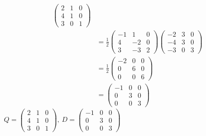 \documentclass[13pt]{article}
\begin{document}
\begin{enumerate}[label=(\alph*),leftmargin=*]
\begin{align*}
        \begin{pmatrix}
          2 & 1 & 0 \\
          4 & 1 & 0 \\
          3 & 0 & 1
        \end{pmatrix} \\
      &= \frac{1}{2}
        \begin{pmatrix}
          -1 & 1 & 0 \\
          4 & -2 & 0 \\
          3 & -3 & 2
        \end{pmatrix}
        \begin{pmatrix}
          -2 & 3 & 0 \\
          -4 & 3 & 0 \\
          -3 & 0 & 3
        \end{pmatrix} \\
      &= \frac{1}{2}
        \begin{pmatrix}
          -2 & 0 & 0 \\
          0 & 6 & 0 \\
          0 & 0 & 6
        \end{pmatrix} \\
      &=
        \begin{pmatrix}
          -1 & 0 & 0 \\
          0 & 3 & 0 \\
          0 & 0 & 3
        \end{pmatrix}
  \end{align*}
  $Q =
  \begin{pmatrix}
    2 & 1 & 0 \\
    4 & 1 & 0 \\
    3 & 0 & 1       
  \end{pmatrix}, \ D =
  \begin{pmatrix}
    -1 & 0 & 0 \\
    0 & 3 & 0 \\
    0 & 0 & 3
  \end{pmatrix}$


\end{enumerate}
\end{document}
